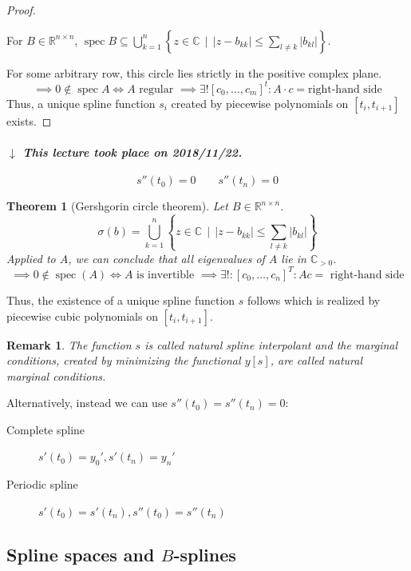 \documentclass[a4paper]{article}
\newcounter{lecref}[section]
\numberwithin{lecref}{section}
\theoremstyle{break}
\newtheorem{thm}[lecref]{Theorem}
\newtheorem*{Remark}{Remark}
\newcommand{\dateref}[1]{%
  \begin{mdframed}[backgroundcolor=gray!10,innerbottommargin=0pt,innertopmargin=0pt]
    \paragraph{\textit{$\downarrow$ This lecture took place on #1.}}%
  \end{mdframed}%
}
\newcommand{\Abs}[1]{\left|#1\right|}
\newcommand{\SetDef}[2]{\left\{#1\,\mid\,#2\right\}}
\DeclareMathOperator{\spec}{spec}
\begin{document}
\begin{proof}
  \begin{theorem}
    For $B \in \mathbb R^{n\times n}$, $\spec{B} \subseteq \bigcup_{k=1}^n\SetDef{z \in \mathbb C}{\Abs{z - b_{kk}} \leq \sum_{l \neq k} \Abs{b_{kl}}}$.
  \end{theorem}

  For some arbitrary row, this circle lies strictly in the positive complex plane.
  \[ \implies 0 \not\in \spec{A} \iff A \text{ regular } \implies \exists! [c_0, \dots, c_m]^t: A\cdot c = \text{right-hand side} \]
  Thus, a unique spline function $s_i$ created by piecewise polynomials on $[t_i, t_{i+1}]$ exists.

\end{proof}

\dateref{2018/11/22}

\[ s''(t_0) = 0 \qquad s''(t_n) = 0 \]

\begin{thm}[Gershgorin circle theorem]
  Let $B \in \mathbb R^{n \times n}$.
  \[ \sigma(b) = \bigcup_{k=1}^n \SetDef{z \in \mathbb C}{\Abs{z - b_{kk}} \leq \sum_{l \neq k} \Abs{b_{kl}}} \]
  Applied to $A$, we can conclude that all eigenvalues of $A$ lie in $\mathbb C_{> 0}$.
  \[ \implies 0 \not\in \spec(A) \iff A \text{ is invertible } \implies \exists!: [c_0, \dots, c_n]^T: Ac = \text{ right-hand side} \]
\end{thm}

Thus, the existence of a unique spline function $s$ follows which is realized by piecewise cubic polynomials on $[t_i, t_{i+1}]$.

\begin{Remark}
  The function $s$ is called \emph{natural spline interpolant} and the marginal conditions, created by minimizing the functional $y[s]$, are called \emph{natural marginal conditions}.
\end{Remark}

Alternatively, instead we can use $s''(t_0) = s''(t_n) = 0$:
\begin{description}
  \item[Complete spline]  $s'(t_0) = y_0', s'(t_n) = y_n'$
  \item[Periodic spline] $s'(t_0) = s'(t_n), s''(t_0) = s''(t_n)$
\end{description}

\subsection{Spline spaces and $B$-splines}
\end{document}
